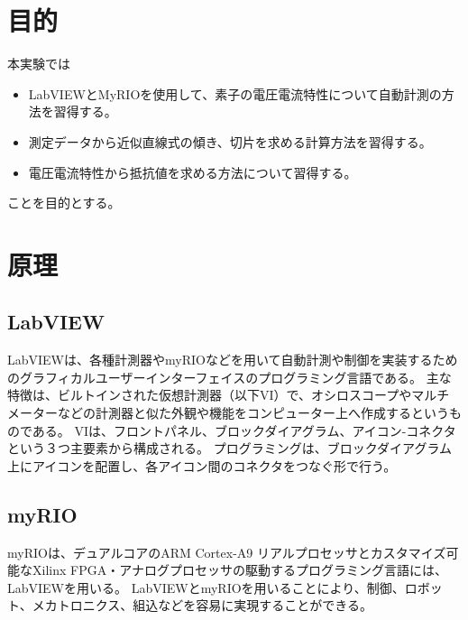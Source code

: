 \documentclass[11pt,dvipdfmx]{jarticle}
\begin{document}
\begin{jikkenTitle}
	\subTitle{} %
	\kyoudouII{} %
	\yoteibiIII{}%
\end{jikkenTitle}

\section{目的}
本実験では
\begin{itemize}
	\item LabVIEWとMyRIOを使用して、素子の電圧電流特性について自動計測の方法を習得する。
	\item 測定データから近似直線式の傾き、切片を求める計算方法を習得する。
	\item 電圧電流特性から抵抗値を求める方法について習得する。
\end{itemize}
ことを目的とする。

\section{原理}
\subsection{LabVIEW}
LabVIEWは、各種計測器やmyRIOなどを用いて自動計測や制御を実装するためのグラフィカルユーザーインターフェイスのプログラミング言語である。
主な特徴は、ビルトインされた仮想計測器（以下VI）で、オシロスコープやマルチメーターなどの計測器と似た外観や機能をコンピューター上へ作成するというものである。
VIは、フロントパネル、ブロックダイアグラム、アイコン-コネクタという３つ主要素から構成される。
プログラミングは、ブロックダイアグラム上にアイコンを配置し、各アイコン間のコネクタをつなぐ形で行う。

\subsection{myRIO}
myRIOは、デュアルコアのARM Cortex-A9 リアルプロセッサとカスタマイズ可能なXilinx FPGA・アナログプロセッサの駆動するプログラミング言語には、LabVIEWを用いる。
LabVIEWとmyRIOを用いることにより、制御、ロボット、メカトロニクス、組込などを容易に実現することができる。
\end{document}
